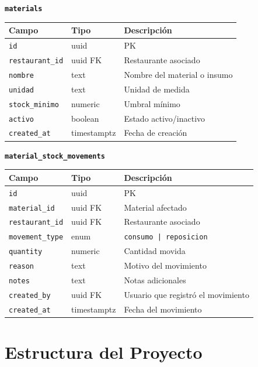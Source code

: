\vspace{8pt}
\noindent\textbf{\texttt{materials}}

\begin{tabular}{lll}
  \toprule
  \textbf{Campo} & \textbf{Tipo} & \textbf{Descripción} \\
  \midrule
  \texttt{id} & uuid & PK \\
  \texttt{restaurant\_id} & uuid FK & Restaurante asociado \\
  \texttt{nombre} & text & Nombre del material o insumo \\
  \texttt{unidad} & text & Unidad de medida \\
  \texttt{stock\_minimo} & numeric & Umbral mínimo \\
  \texttt{activo} & boolean & Estado activo/inactivo \\
  \texttt{created\_at} & timestamptz & Fecha de creación \\
  \bottomrule
\end{tabular}

\vspace{8pt}
\noindent\textbf{\texttt{material\_stock\_movements}}

\begin{tabular}{lll}
  \toprule
  \textbf{Campo} & \textbf{Tipo} & \textbf{Descripción} \\
  \midrule
  \texttt{id} & uuid & PK \\
  \texttt{material\_id} & uuid FK & Material afectado \\
  \texttt{restaurant\_id} & uuid FK & Restaurante asociado \\
  \texttt{movement\_type} & enum & \texttt{consumo | reposicion} \\
  \texttt{quantity} & numeric & Cantidad movida \\
  \texttt{reason} & text & Motivo del movimiento \\
  \texttt{notes} & text & Notas adicionales \\
  \texttt{created\_by} & uuid FK & Usuario que registró el movimiento \\
  \texttt{created\_at} & timestamptz & Fecha del movimiento \\
  \bottomrule
\end{tabular}

\section{Estructura del Proyecto}

